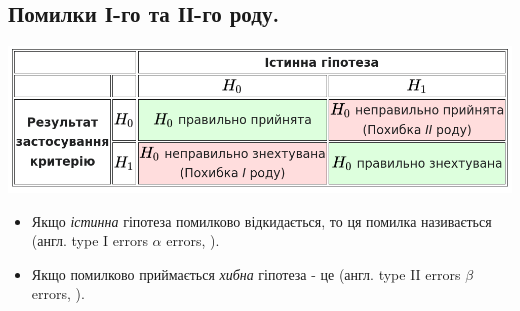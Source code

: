 \subsection{Помилки І-го та ІІ-го роду.}
\begin{center}
\vspace*{2em}
 \includegraphics[scale=0.4]{assets/lectures_part_6-4c5b9490.png}
\end{center}
\vspace*{1em}
\begin{itemize}
  \item Якщо \textit{істинна} гіпотеза помилково відкидається, то ця помилка називається  (англ. type I errors $\alpha$ errors, ).
  \item Якщо помилково приймається \textit{хибна} гіпотеза - це  (англ. type II errors $\beta$ errors, ).
\end{itemize}
